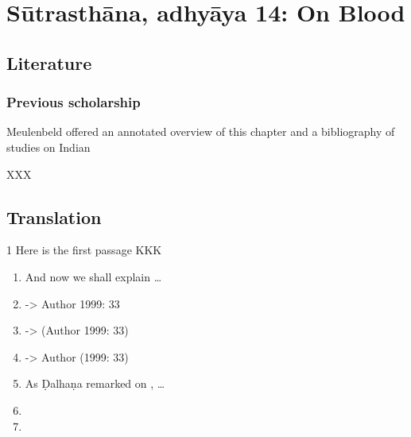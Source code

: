 
\section{Sūtrasthāna, adhyāya 14:  On Blood}


\subsection{Literature} 

\subsubsection{Previous scholarship}

Meulenbeld offered an annotated overview of this chapter and a bibliography
of studies on Indian 



XXX

\subsection{Translation}

\begin{translation}    
\item [1] Here is the first passage KKK

   \begin{enumerate}
  
       \item 
    And now we shall explain \ldots {}

\item 

    \cite[33]{adri-1984} -> Author 1999: 33
\item     
    \citep[33]{adri-1984} -> (Author 1999: 33)
\item     
    \citet[33]{adri-1984} -> Author (1999: 33) 
\item 
    As Ḍalhaṇa remarked on , \ldots  %
\item \SS
\item \CS
   \end{enumerate}
    

\end{translation}

